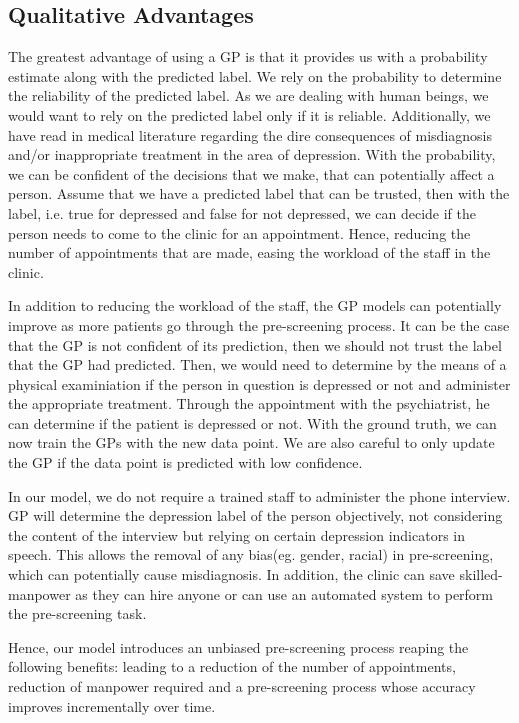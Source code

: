 \documentclass{article}
\begin{document}
	\subsection{Qualitative Advantages}
	The greatest advantage of using a GP is that it provides us with a probability estimate along with the predicted label. We rely on the probability to determine the reliability of the predicted label. As we are dealing with human beings, we would want to rely on the predicted label only if it is reliable. Additionally, we have read in medical literature regarding the dire consequences of misdiagnosis and/or inappropriate treatment\cite{nasrallah2015consequences,bowden2001strategies,dunner2003clinical} in the area of depression. With the probability, we can be confident of the decisions that we make, that can potentially affect a person. Assume that we have a predicted label that can be trusted, then with the label, i.e. true for depressed and false for not depressed, we can decide if the person needs to come to the clinic for an appointment. Hence, reducing the number of appointments that are made, easing the workload of the staff in the clinic.
	
	In addition to reducing the workload of the staff, the GP models can potentially improve as more patients go through the pre-screening process. It can be the case that the GP is not confident of its prediction, then we should not trust the label that the GP had predicted. Then, we would need to determine by the means of a physical examiniation if the person in question is depressed or not and administer the appropriate treatment. Through the appointment with the psychiatrist, he can determine if the patient is depressed or not. With the ground truth, we can now train the GPs with the new data point. We are also careful to only update the GP if the data point is predicted with low confidence.

	In our model, we do not require a trained staff to administer the phone interview. GP will determine the depression label of the person objectively, not considering the content of the interview but relying on certain depression indicators in speech\cite{nimh2015}. This allows the removal of any bias(eg. gender, racial) in pre-screening, which can potentially cause misdiagnosis. In addition, the clinic can save skilled-manpower as they can hire anyone or can use an automated system to perform the pre-screening task.
	
	Hence, our model introduces an unbiased pre-screening process reaping the following benefits: leading to a reduction of the number of appointments, reduction of manpower required and a pre-screening process whose accuracy improves incrementally over time. 
\end{document}
